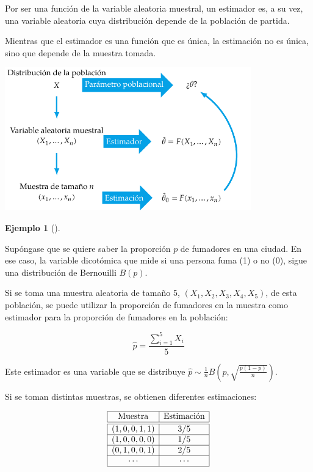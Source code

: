 \documentclass[
  a4paper,
]{scrreport}
\theoremstyle{plain}
\theoremstyle{definition}
\newtheorem{example}{Ejemplo}[chapter]
\theoremstyle{definition}
\theoremstyle{remark}
\begin{document}
Por ser una función de la variable aleatoria muestral, un estimador es,
a su vez, una variable aleatoria cuya distribución depende de la
población de partida.

Mientras que el estimador es una función que es única, la estimación no
es única, sino que depende de la muestra tomada.

\begin{center}
\includegraphics[width=0.8\textwidth,height=\textheight]{img/estimacion/estimador-estimacion.pdf}
\end{center}

\begin{example}[]\protect\hypertarget{exm-estimacion-fumadores}{}\label{exm-estimacion-fumadores}

Supóngase que se quiere saber la proporción \(p\) de fumadores en una
ciudad. En ese caso, la variable dicotómica que mide si una persona fuma
(1) o no (0), sigue una distribución de Bernouilli \(B(p)\).

Si se toma una muestra aleatoria de tamaño 5, \((X_1,X_2,X_3,X_4,X_5)\),
de esta población, se puede utilizar la proporción de fumadores en la
muestra como estimador para la proporción de fumadores en la población:

\[
\hat p = \frac{\sum_{i=1}^5 X_i}{5}
\]

Este estimador es una variable que se distribuye
\(\hat p\sim \frac{1}{n}B\left(p,\sqrt{\frac{p(1-p)}{n}}\right)\).

Si se toman distintas muestras, se obtienen diferentes estimaciones:

\[
\begin{array}{|c|c|}
\hline
\mbox{Muestra} & \mbox{Estimación}\\
\hline\hline
(1, 0, 0, 1, 1) & 3/5\\
\hline
(1, 0, 0, 0, 0) & 1/5\\
\hline
(0, 1, 0, 0, 1) & 2/5\\
\hline
\cdots & \cdots\\
\hline
\end{array}
\]

\end{example}
\end{document}

